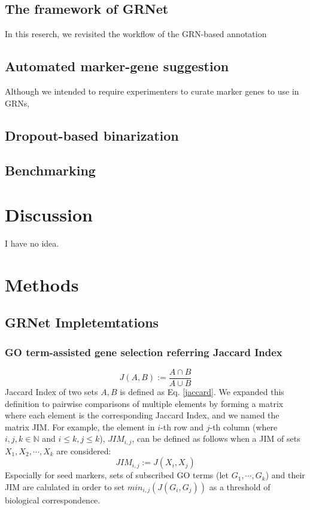 \documentclass{article}
\begin{document}
\subsection*{The framework of GRNet}
In this reserch, we revisited the workflow of the GRN-based annotation

\subsection*{Automated marker-gene suggestion}
Although we intended to require experimenters to curate marker genes to use
in GRNs,
\subsection*{Dropout-based binarization}
\subsection*{Benchmarking}

\section*{Discussion}
I have no idea.

\section*{Methods}
\subsection*{GRNet Impletemtations}

\subsubsection*{GO term-assisted gene selection referring Jaccard Index}
\begin{equation}\label{jaccard}
  J(A, B) := \frac{A\cap B}{A\cup B}
\end{equation}
Jaccard Index of two sets $A, B$ is defined as Eq. \eqref{jaccard}. We expanded this 
definition to pairwise comparisons of multiple elements by forming a matrix 
where each element is the corresponding Jaccard Index, and we named the matrix \ac{JIM}. For example, the element in 
$i$-th row and $j$-th column (where $i, j, k\in\mathbb{N}$ and $i\leq k, j\leq k$), $JIM_{i,j}$, can be defined as
follows when a JIM of sets $X_1, X_2,\cdots, X_k$ are considered:
\begin{equation}\label{jim}
  JIM_{i, j} := J(X_i, X_j)
\end{equation}
Especially for seed markers, sets of subscribed GO terms (let $G_1, \cdots, G_k$)
and their JIM are calulated in order to set $min_{i,j}(J(G_i, G_j))$ as a threshold of 
biological correspondence.
\end{document}
